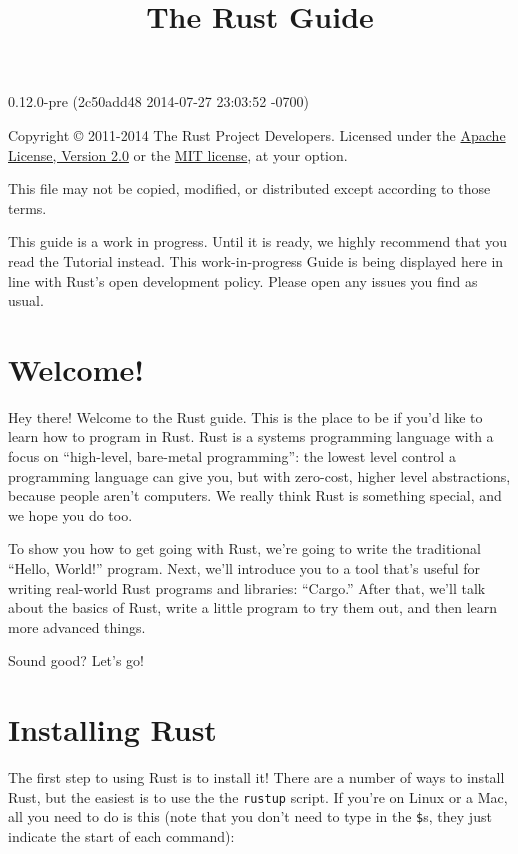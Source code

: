 \documentclass[]{article}
\title{The Rust Guide}
\begin{document}
\maketitle

0.12.0-pre (2c50add48 2014-07-27 23:03:52 -0700)

Copyright © 2011-2014 The Rust Project Developers. Licensed under the
\href{http://www.apache.org/licenses/LICENSE-2.0}{Apache License,
Version 2.0} or the \href{http://opensource.org/licenses/MIT}{MIT
license}, at your option.

This file may not be copied, modified, or distributed except according
to those terms.

{
\hypersetup{linkcolor=black}
\setcounter{tocdepth}{3}
\tableofcontents
}
This guide is a work in progress. Until it is ready, we highly recommend
that you read the Tutorial instead. This work-in-progress Guide is being
displayed here in line with Rust's open development policy. Please open
any issues you find as usual.

\section{Welcome!}\label{welcome}

Hey there! Welcome to the Rust guide. This is the place to be if you'd
like to learn how to program in Rust. Rust is a systems programming
language with a focus on ``high-level, bare-metal programming'': the
lowest level control a programming language can give you, but with
zero-cost, higher level abstractions, because people aren't computers.
We really think Rust is something special, and we hope you do too.

To show you how to get going with Rust, we're going to write the
traditional ``Hello, World!'' program. Next, we'll introduce you to a
tool that's useful for writing real-world Rust programs and libraries:
``Cargo.'' After that, we'll talk about the basics of Rust, write a
little program to try them out, and then learn more advanced things.

Sound good? Let's go!

\section{Installing Rust}\label{installing-rust}

The first step to using Rust is to install it! There are a number of
ways to install Rust, but the easiest is to use the the \texttt{rustup}
script. If you're on Linux or a Mac, all you need to do is this (note
that you don't need to type in the \texttt{\$}s, they just indicate the
start of each command):
\end{document}
